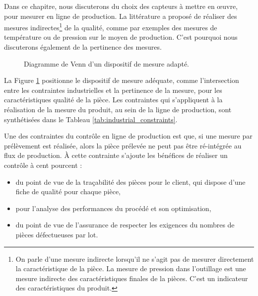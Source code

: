 Dans ce chapitre, nous discuterons du choix des capteurs à mettre en œuvre, pour mesurer en ligne de production.
La littérature a proposé de réaliser des mesures indirectes\footnote{On parle d'une mesure indirecte lorsqu'il ne s'agit pas de mesurer directement la caractéristique de la pièce. La mesure de pression dans l'outillage est une mesure indirecte des caractéristiques finales de la pièces. C'est un indicateur des caractéristiques du produit.} de la qualité, comme par exemples des mesures de température ou de pression sur le moyen de production.
C'est pourquoi nous discuterons également de la pertinence des mesures.

\begin{figure}[hbtp]
	\centering
	\caption{Diagramme de Venn d'un dispositif de mesure adapté.}
	\label{fig:venn_choice}
\end{figure}

La Figure \ref{fig:venn_choice} positionne le dispositif de mesure adéquate, comme l'intersection entre les contraintes industrielles et la pertinence de la mesure, pour les caractéristiques qualité de la pièce.
Les contraintes qui s'appliquent à la réalisation de la mesure du produit, au sein de la ligne de production, sont synthétisées dans le Tableau \ref{tab:industrial_constraints}.

Une des contraintes du contrôle en ligne de production est que, si une mesure par prélèvement est réalisée, alors la pièce prélevée ne peut pas être ré-intégrée  au flux de production.
À cette contrainte s'ajoute les bénéfices de réaliser un contrôle à cent pourcent :
\begin{itemize}
	\item du point de vue de la traçabilité des pièces pour le client, qui dispose d'une fiche de qualité pour chaque pièce, \item pour l'analyse des performances du procédé et son optimisation,
	\item du point de vue de l'assurance de respecter les exigences du nombres de pièces défectueuses par lot.
\end{itemize}

